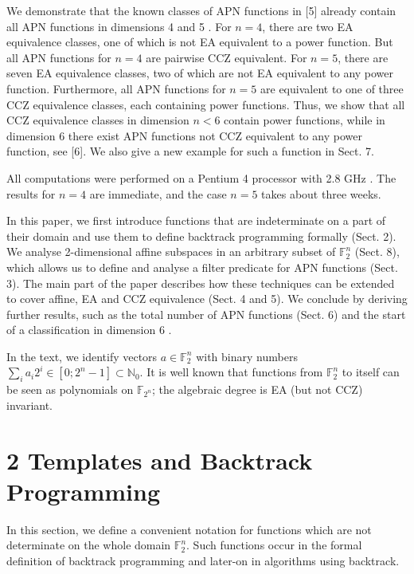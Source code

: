 \documentclass[10pt]{article}
\begin{document}
We demonstrate that the known classes of APN functions in [5] already contain all APN functions in dimensions 4 and 5 . For $n=4$, there are two EA equivalence classes, one of which is not EA equivalent to a power function. But all APN functions for $n=4$ are pairwise CCZ equivalent. For $n=5$, there are seven EA equivalence classes, two of which are not EA equivalent to any power function. Furthermore, all APN functions for $n=5$ are equivalent to one of three CCZ equivalence classes, each containing power functions. Thus, we show that all CCZ equivalence classes in dimension $n<6$ contain power functions, while in dimension 6 there exist APN functions not CCZ equivalent to any power function, see [6]. We also give a new example for such a function in Sect. 7.

All computations were performed on a Pentium 4 processor with 2.8 GHz . The results for $n=4$ are immediate, and the case $n=5$ takes about three weeks.

In this paper, we first introduce functions that are indeterminate on a part of their domain and use them to define backtrack programming formally (Sect. 2). We analyse 2-dimensional affine subspaces in an arbitrary subset of $\mathbb{F}_{2}^{n}$ (Sect. 8), which allows us to define and analyse a filter predicate for APN functions (Sect. 3). The main part of the paper describes how these techniques can be extended to cover affine, EA and CCZ equivalence (Sect. 4 and 5). We conclude by deriving further results, such as the total number of APN functions (Sect. 6) and the start of a classification in dimension 6 .

In the text, we identify vectors $a \in \mathbb{F}_{2}^{n}$ with binary numbers $\sum_{i} a_{i} 2^{i} \in \left[0 ; 2^{n}-1\right] \subset \mathbb{N}_{0}$. It is well known that functions from $\mathbb{F}_{2}^{n}$ to itself can be seen as polynomials on $\mathbb{F}_{2^{n}}$; the algebraic degree is EA (but not CCZ) invariant.

\section*{2 Templates and Backtrack Programming}
In this section, we define a convenient notation for functions which are not determinate on the whole domain $\mathbb{F}_{2}^{n}$. Such functions occur in the formal definition of backtrack programming and later-on in algorithms using backtrack.
\end{document}
